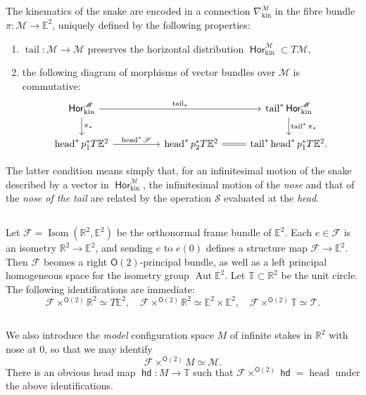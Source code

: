 \documentclass{amsart}
\def\RR{\mathbb{R}}
\def\EE{\mathbb{E}}
\def\TT{\mathbb{T}}
\def\sF{\mathscr{F}}
\def\sT{\mathscr{T}}
\def\sM{\mathscr{M}}
\def\sS{\mathscr{S}}
\DeclareMathOperator{\Isom}{\mathrm{Isom}}
\DeclareMathOperator{\Aut}{\mathrm{Aut}}
\def\O{\mathsf{O}}
\DeclareMathOperator{\head}{{\mathsf{hd}}}
\DeclareMathOperator{\stail}{{\mathrm{tail}}}
\DeclareMathOperator{\shead}{{\mathrm{head}}}
\DeclareMathOperator{\Hor}{\mathsf{Hor}}
\def\kin{\mathrm{kin}}
\theoremstyle{definition}
\begin{document}
\subsection{}
The kinematics of the snake are encoded in a connection $\nabla^\sM_\kin$
in the fibre bundle $\pi : \sM \to \EE^2$, uniquely defined by the following properties:
\begin{enumerate}
        \item $\stail : \sM \to \sM$ preserves the horizontal distribution $\Hor_\kin^\sM \subset T\sM$,
        \item the following diagram of morphisms of vector bundles over $\sM$ is commutative:
                $$\begin{tikzcd}
                        \Hor_\kin^\sM \arrow[rrr,"\stail_*"] \arrow[d,"\pi_*"] & & & \stail^*\Hor^\sM_\kin 
                                                                               \arrow[d,"\stail^*\pi_*"] \\
                        \shead^* p_1^* T\EE^2 \arrow[rr,"\shead^*\sS"] & & \shead^* p_2^* T\EE^2
                        \arrow[r,equal] & \stail^*\shead^*p_1^*T\EE^2.
                \end{tikzcd}$$
\end{enumerate}
The latter condition means simply that, for an infinitesimal motion
of the snake described by a vector in $\Hor^\sM_\kin$, the infinitesimal
motion of the \emph{nose} and that of the \emph{nose of the tail} are
related by the operation $\sS$ evaluated at the \emph{head}.

\subsection{}
Let $\sF = \Isom(\RR^2,\EE^2)$ be the orthonormal frame bundle of $\EE^2$.
Each $e \in \sF$ is an isometry $\RR^2 \to \EE^2$, and sending $e$ to $e(0)$
defines a structure map $\sF \to \EE^2$. Then $\sF$ beomes a right $\O(2)$-principal bundle,
as well as a left principal homogeneous space for the isometry group $\Aut\EE^2$.
Let $\TT \subset \RR^2$ be the unit circle. The following identifications are immediate:
$$
 \sF \times^{\O(2)} \RR^2 \simeq T\EE^2,\quad
 \sF \times^{\O(2)} \RR^2 \simeq \EE^2 \times \EE^2,\quad
 \sF \times^{\O(2)} \TT \simeq \sT.
$$
\subsection{}
We also introduce the \emph{model} configuration space $M$ of infinite stakes in $\RR^2$ with nose at $0$,
so that we may identify
$$
 \sF \times^{\O(2)} M \simeq \sM.
$$
There is an obvious head map $\head:M \to \TT$ such that
$\sF \times^{\O(2)}\head = \shead$ under the above identifications.
\end{document}

